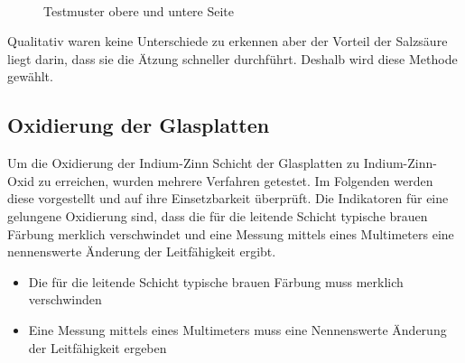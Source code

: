 \begin{figure}[t]
  \centering
~
 \caption{Testmuster obere und untere Seite}
  \label{testmuster_seiten}
 \end{figure}

Qualitativ waren keine Unterschiede zu erkennen aber der Vorteil der Salzsäure liegt darin, dass sie die Ätzung schneller durchführt. Deshalb wird diese Methode gewählt.

\subsection{Oxidierung der Glasplatten}


Um die Oxidierung der Indium-Zinn Schicht der Glasplatten zu Indium-Zinn-Oxid zu erreichen, wurden mehrere Verfahren getestet. Im Folgenden werden diese vorgestellt und auf ihre Einsetzbarkeit überprüft.
Die Indikatoren für eine gelungene Oxidierung sind, dass die für die leitende Schicht typische brauen Färbung merklich verschwindet und eine Messung mittels eines Multimeters eine nennenswerte Änderung der Leitfähigkeit ergibt.


\begin{itemize}
\item Die für die leitende Schicht typische brauen Färbung muss merklich verschwinden
\item Eine Messung mittels eines Multimeters muss eine Nennenswerte Änderung der Leitfähigkeit ergeben\\
\end{itemize}

